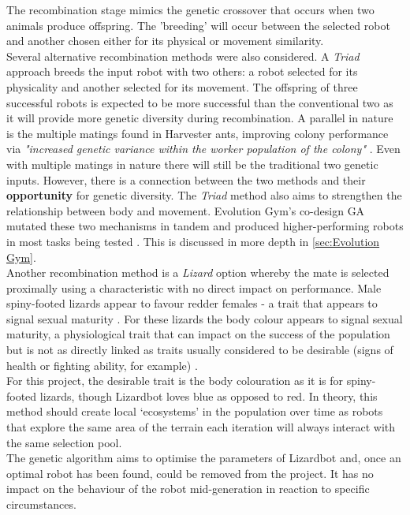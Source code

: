 \documentclass{article}
\begin{document}
\noindent The recombination stage mimics the genetic crossover that occurs when two animals produce offspring. The 'breeding' will occur between the selected robot and another chosen either for its physical or movement similarity. \\

Several alternative recombination methods were also considered. A \textit{Triad} approach breeds the input robot with two others: a robot selected for its physicality and another selected for its movement. The offspring of three successful robots is expected to be more successful than the conventional two as it will provide more genetic diversity during recombination. A parallel in nature is the multiple matings found in Harvester ants, improving colony performance via \textit{"increased genetic variance within the worker population of the colony"} . Even with multiple matings in nature there will still be the traditional two genetic inputs. However, there is a connection between the two methods and their \textbf{opportunity} for genetic diversity. 
The \textit{Triad} method also aims to strengthen the relationship between body and movement. Evolution Gym's co-design GA mutated these two mechanisms in tandem and produced higher-performing robots in most tasks being tested . This is discussed in more depth in \ref{sec:Evolution Gym}.\\

\noindent Another recombination method is a \textit{Lizard} option whereby the mate is selected proximally using a characteristic with no direct impact on performance. Male spiny-footed lizards appear to favour redder females - a trait that appears to signal sexual maturity . For these lizards the body colour appears to signal sexual maturity, a physiological trait that can impact on the success of the population but is not as directly linked as traits usually considered to be desirable (signs of health or fighting ability, for example) .\\
For this project, the desirable trait is the body colouration as it is for spiny-footed lizards, though Lizardbot loves blue as opposed to red. In theory, this method should create local ‘ecosystems’ in the population over time as robots that explore the same area of the terrain each iteration will always interact with the same selection pool. \\

The genetic algorithm aims to optimise the parameters of Lizardbot and, once an optimal robot has been found, could be removed from the project. It has no impact on the behaviour of the robot mid-generation in reaction to specific circumstances.
\end{document}
